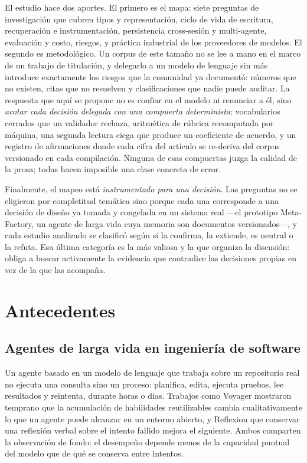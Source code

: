 \documentclass[conference]{IEEEtran}
\begin{document}
El estudio hace dos aportes. El primero es el mapa: siete preguntas de investigación que cubren
tipos y representación, ciclo de vida de escritura, recuperación e instrumentación, persistencia
cross-sesión y multi-agente, evaluación y costo, riesgos, y práctica industrial de los proveedores de
modelos. El segundo es metodológico. Un corpus de este tamaño no se lee a mano en el marco de un
trabajo de titulación, y delegarlo a un modelo de lenguaje sin más introduce exactamente los riesgos
que la comunidad ya documentó: números que no existen, citas que no resuelven y clasificaciones que
nadie puede auditar. La respuesta que aquí se propone no es confiar en el modelo ni renunciar a él,
sino \emph{acotar cada decisión delegada con una compuerta determinista}: vocabularios cerrados que
un validador rechaza, aritmética de rúbrica recomputada por máquina, una segunda lectura ciega que
produce un coeficiente de acuerdo, y un registro de afirmaciones donde cada cifra del artículo se
re-deriva del corpus versionado en cada compilación. Ninguna de esas compuertas juzga la calidad de
la prosa; todas hacen imposible una clase concreta de error.

Finalmente, el mapeo está \emph{instrumentado para una decisión}. Las preguntas no se eligieron por
completitud temática sino porque cada una corresponde a una decisión de diseño ya tomada y
congelada en un sistema real —el prototipo Meta-Factory, un agente de larga vida cuya memoria son
documentos versionados—, y cada estudio analizado se clasificó según si la confirma, la extiende, es
neutral o la refuta. Esa última categoría es la más valiosa y la que organiza la discusión: obliga a
buscar activamente la evidencia que contradice las decisiones propias en vez de la que las
acompaña.

\section{Antecedentes}
\label{sec:background}

\subsection{Agentes de larga vida en ingeniería de software}

Un agente basado en un modelo de lenguaje que trabaja sobre un repositorio real no ejecuta una
consulta sino un proceso: planifica, edita, ejecuta pruebas, lee resultados y reintenta, durante
horas o días. Trabajos como Voyager \cite{cW4378505261} mostraron temprano que la acumulación de
habilidades reutilizables cambia cualitativamente lo que un agente puede alcanzar en un entorno
abierto, y Reflexion \cite{cW4353112996} que conservar una reflexión verbal sobre el intento fallido
mejora el siguiente. Ambos comparten la observación de fondo: el desempeño depende menos de la
capacidad puntual del modelo que de qué se conserva entre intentos.
\end{document}
